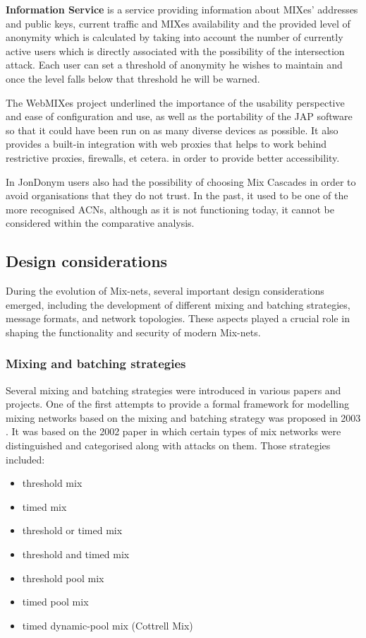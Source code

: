 \textbf{Information Service} is a service providing information about MIXes’ addresses and public keys, current traffic and MIXes availability and the provided level of anonymity which is calculated by taking into account the number of currently active users which is directly associated with the possibility of the intersection attack. Each user can set a threshold of anonymity he wishes to maintain and once the level falls below that threshold he will be warned.

The WebMIXes project underlined the importance of the usability perspective and ease of configuration and use, as well as the portability of the JAP software so that it could have been run on as many diverse devices as possible. It also provides a built-in integration with web proxies that helps to work behind restrictive proxies, firewalls, et cetera. in order to provide better accessibility.

In JonDonym users also had the possibility of choosing Mix Cascades in order to avoid organisations that they do not trust. In the past, it used to be one of the more recognised ACNs, although as it is not functioning today, it cannot be considered within the comparative analysis.

\subsection{Design considerations}

During the evolution of Mix-nets, several important design considerations emerged, including the development of different mixing and batching strategies, message formats, and network topologies. These aspects played a crucial role in shaping the functionality and security of modern Mix-nets.

\subsubsection{Mixing and batching strategies}
Several mixing and batching strategies were introduced in various papers and projects. One of the first attempts to provide a formal framework for modelling mixing networks based on the mixing and batching strategy was proposed in 2003 \cite{generalising}. It was based on the 2002 paper \cite{mix-attacks} in which certain types of mix networks were distinguished and categorised along with attacks on them. Those strategies included:
\begin{itemize}
    \item threshold mix
    \item timed mix
    \item threshold or timed mix
    \item threshold and timed mix
    \item threshold pool mix
    \item timed pool mix
    \item timed dynamic-pool mix (Cottrell Mix)
\end{itemize}

